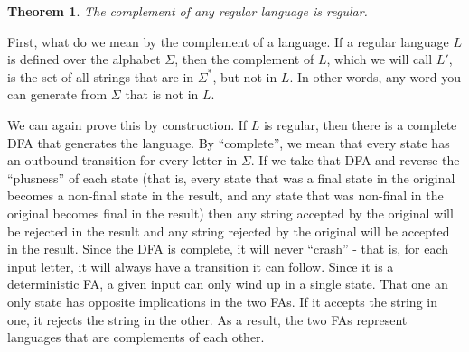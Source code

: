 \documentclass[letterpaper,12pt,openany,reqno]{book}%
\newtheorem{theorem}{Theorem}
\begin{document}
\begin{theorem}\label{T.comp.r.is.r}
The complement of any regular language is regular.
\end{theorem}
First, what do we mean by the complement of a language. If a regular language $L$ is defined over the alphabet $\Sigma$, then the complement of $L$, which we will call $L'$, is the set of all strings that are in $\Sigma ^*$, but not in $L$. In other words, any word you can generate from $\Sigma$ that is not in $L$.

We can again prove this by construction. If $L$ is regular, then there is a complete DFA that generates the language. By ``complete'', we mean that every state has an outbound transition for every letter in $\Sigma$. If we take that DFA and reverse the ``plusness'' of each state (that is, every state that was a final state in the original becomes a non-final state in the result, and any state that was non-final in the original becomes final in the result) then any string accepted by the original will be rejected in the result and any string rejected by the original will be accepted in the result. Since the DFA is complete, it will never ``crash'' - that is, for each input letter, it will always have a transition it can follow. Since it is a deterministic FA, a given input can only wind up in a single state. That one an only state has opposite implications in the two FAs. If it accepts the string in one, it rejects the string in the other. As a result, the two FAs represent languages that are complements of each other.
\end{document}
